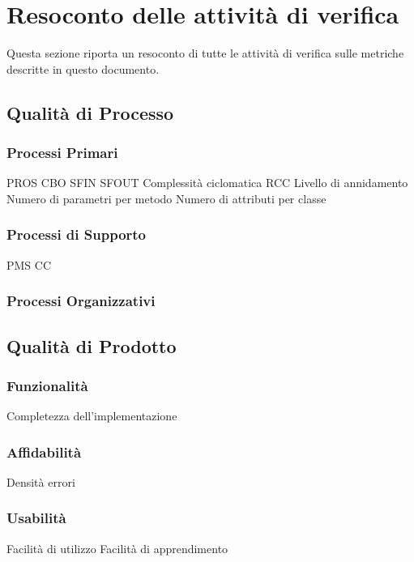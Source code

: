 \section{Resoconto delle attività di verifica}
	Questa sezione riporta un resoconto di tutte le attività di verifica sulle metriche descritte in questo documento.

	\subsection{Qualità di Processo}
		\subsubsection{Processi Primari}
				PROS
				CBO		%
				SFIN
				SFOUT
				Complessità ciclomatica
				RCC
				Livello di annidamento
				Numero di parametri per metodo
				Numero di attributi per classe
			
		\subsubsection{Processi di Supporto}
				
				PMS		%
				CC	%
				
		\subsubsection{Processi Organizzativi}
			
	\subsection{Qualità di Prodotto}
		\subsubsection{Funzionalità}
			Completezza dell'implementazione	%
		\subsubsection{Affidabilità}
			Densità errori	%
		\subsubsection{Usabilità}
			Facilità di utilizzo	%
			Facilità di apprendimento
